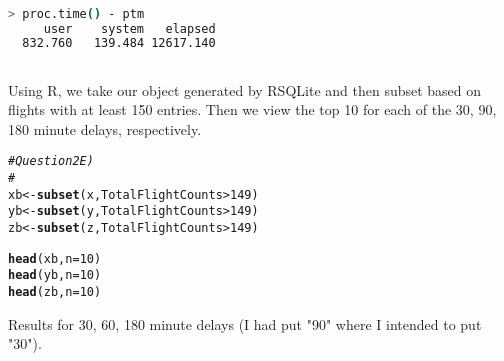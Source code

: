 \documentclass{article}\usepackage[]{graphicx}\usepackage[]{color}
\makeatletter
\newcommand{\hlnum}[1]{\textcolor[rgb]{0.686,0.059,0.569}{#1}}%
\newcommand{\hlcom}[1]{\textcolor[rgb]{0.678,0.584,0.686}{\textit{#1}}}%
\newcommand{\hlopt}[1]{\textcolor[rgb]{0,0,0}{#1}}%
\newcommand{\hlstd}[1]{\textcolor[rgb]{0.345,0.345,0.345}{#1}}%
\newcommand{\hlkwb}[1]{\textcolor[rgb]{0.69,0.353,0.396}{#1}}%
\newcommand{\hlkwc}[1]{\textcolor[rgb]{0.333,0.667,0.333}{#1}}%
\newcommand{\hlkwd}[1]{\textcolor[rgb]{0.737,0.353,0.396}{\textbf{#1}}}%
\newenvironment{kframe}{%
 \def\at@end@of@kframe{}%
 \ifinner\ifhmode%
  \def\at@end@of@kframe{\end{minipage}}%
  \begin{minipage}{\columnwidth}%
 \fi\fi%
 \def\FrameCommand##1{\hskip\@totalleftmargin \hskip-\fboxsep
 \colorbox{shadecolor}{##1}\hskip-\fboxsep
     \hskip-\linewidth \hskip-\@totalleftmargin \hskip\columnwidth}%
 \MakeFramed {\advance\hsize-\width
   \@totalleftmargin\z@ \linewidth\hsize
   \@setminipage}}%
 {\par\unskip\endMakeFramed%
 \at@end@of@kframe}
\newenvironment{knitrout}{}{} %
\makeatother
\begin{document}
\begin{lstlisting}[language=bash,caption={Timing for SQLite query}]

> proc.time() - ptm
     user    system   elapsed 
  832.760   139.484 12617.140

\end{lstlisting}

\subsection{}

Using R, we take our object generated by RSQLite and then subset based on flights with at least 150 entries.  Then we view the top 10 for each of the 30, 90, 180 minute delays, respectively.

\begin{knitrout}
\color{fgcolor}\begin{kframe}
\begin{alltt}
\hlcom{# Question 2E)}
\hlcom{# }
\hlstd{xb} \hlkwb{<-} \hlkwd{subset}\hlstd{(x, TotalFlightCounts} \hlopt{>} \hlnum{149}\hlstd{)}
\hlstd{yb} \hlkwb{<-} \hlkwd{subset}\hlstd{(y, TotalFlightCounts} \hlopt{>} \hlnum{149}\hlstd{)}
\hlstd{zb} \hlkwb{<-} \hlkwd{subset}\hlstd{(z, TotalFlightCounts} \hlopt{>} \hlnum{149}\hlstd{)}

\hlkwd{head}\hlstd{(xb,}\hlkwc{n}\hlstd{=}\hlnum{10}\hlstd{)}
\hlkwd{head}\hlstd{(yb,}\hlkwc{n}\hlstd{=}\hlnum{10}\hlstd{)}
\hlkwd{head}\hlstd{(zb,}\hlkwc{n}\hlstd{=}\hlnum{10}\hlstd{)}
\end{alltt}
\end{kframe}
\end{knitrout}

Results for 30, 60, 180 minute delays (I had put "90" where I intended to put "30").
\end{document}
